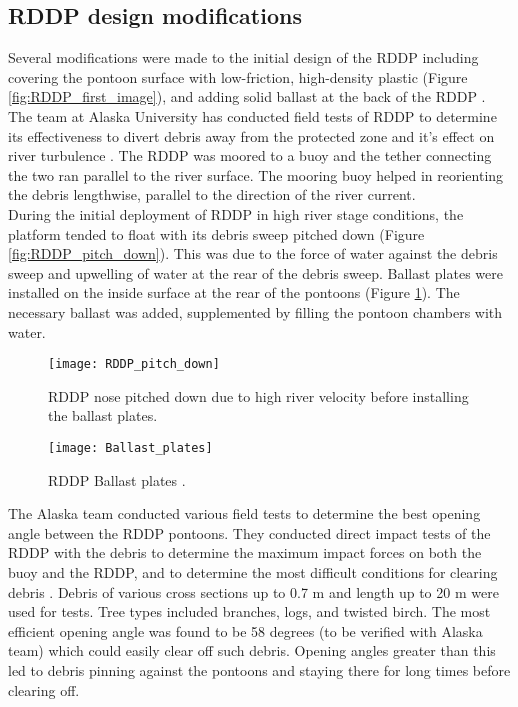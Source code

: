 \subsection{RDDP design modifications}
Several modifications were made to the initial design of the RDDP including covering the pontoon surface with low-friction, high-density plastic (Figure \ref{fig:RDDP_first_image}), and adding solid ballast at the back of the RDDP \citep{Reference7}.\\
The team at Alaska University has conducted field tests of RDDP to determine its effectiveness to divert debris away from the protected zone and it's effect on river turbulence \citep{Reference7}. The RDDP was moored to a buoy and the tether connecting the two ran parallel to the river surface. The mooring buoy helped in reorienting the debris lengthwise, parallel to the direction of the river current.\\
During the initial deployment of RDDP in high river stage conditions, the platform tended to float with its debris sweep pitched down (Figure \ref{fig:RDDP_pitch_down}). This was due to the force of water against the debris sweep and upwelling of water at the rear of the debris sweep. Ballast plates were installed on the inside surface at the rear of the pontoons (Figure \ref{fig:Ballast_plates}). The necessary ballast was added, supplemented by filling the pontoon chambers with water.\\
\begin{figure}
\begin{minipage}{1\textwidth}
\texttt{[image: RDDP\_pitch\_down]}
\caption{\label{fig:RDDP_pitch_down}RDDP nose pitched down due to high river velocity before installing the ballast plates\citep{Reference6}.}
\end{minipage}
\begin{minipage}{1\textwidth}
\texttt{[image: Ballast\_plates]}
\caption{\label{fig:Ballast_plates}RDDP Ballast plates \citep{Reference6}.}
\end{minipage}
\end{figure}
The Alaska team conducted various field tests to determine the best opening angle between the RDDP pontoons. They conducted direct impact tests of the RDDP with the debris to determine the maximum impact forces on both the buoy and the RDDP, and to determine the most difficult conditions for clearing debris \citep{Reference7}. Debris of various cross sections up to 0.7 m and length up to 20 m were used for tests. Tree types included branches, logs, and twisted birch. The most efficient opening angle was found to be 58 degrees (to be verified with Alaska team) which could easily clear off such debris. Opening angles greater than this led to debris pinning against the pontoons and staying there for long times before clearing off.\\
